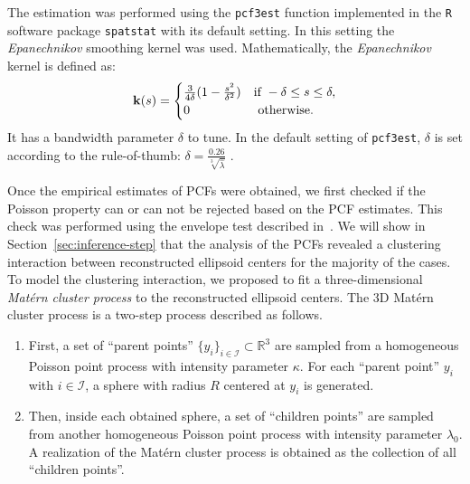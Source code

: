 \documentclass[journal]{IEEEtran}
\begin{document}
The estimation was performed using the \texttt{pcf3est} function
implemented in the \texttt{R} software package \texttt{spatstat}
\cite{baddeley2005spatstat} with its default setting. In this setting
the \textit{Epanechnikov} smoothing kernel \cite{chiu2013stochastic}
was used. Mathematically, the \textit{Epanechnikov} kernel is defined
as:
\begin{equation}
  \label{eq:epan-kernel}
  \mathbf{k}(s) =
  \begin{cases}
    \frac{3}{4\delta} (1 - \frac{s^2}{\delta^2}) & \textnormal{if }
    -\delta \leq s \leq \delta, \\
    0 & \textnormal{ otherwise}.
  \end{cases}
\end{equation}
It has a bandwidth parameter $\delta$ to tune. In the default setting
of \texttt{pcf3est}, $\delta$ is set according to the rule-of-thumb:
$\delta = \frac{0.26}{\sqrt[3]{\hat{\lambda}}}$
\cite{baddeley2005spatstat}.

Once the empirical estimates of PCFs were obtained, we first checked
if the Poisson property can or can not be rejected based on the PCF
estimates. This check was performed using the envelope test described
in~\cite{baddeley2014tests}. We will show in
Section~\ref{sec:inference-step} that the analysis of the PCFs
revealed a clustering interaction between reconstructed ellipsoid
centers for the majority of the cases. To model the clustering
interaction, we proposed to fit a three-dimensional \textit{Mat\'ern
  cluster process} \cite{baddeley2007spatial} to the reconstructed
ellipsoid centers. The 3D Mat\'ern cluster process is a two-step
process described as follows.

\begin{enumerate}

\item First, a set of ``parent points''
  $\{ y_i \}_{i \in \mathcal{I}} \subset \mathbb{R}^3$ are sampled
  from a homogeneous Poisson point process with intensity parameter
  $\kappa$. For each ``parent point'' $y_i$ with $i \in \mathcal{I}$,
  a sphere with radius $R$ centered at $y_i$ is generated.

\item Then, inside each obtained sphere, a set of ``children points''
  are sampled from another homogeneous Poisson point process with
  intensity parameter $\lambda_0$. A realization of the Mat\'ern
  cluster process is obtained as the collection of all ``children
  points''.

\end{enumerate}
\end{document}
